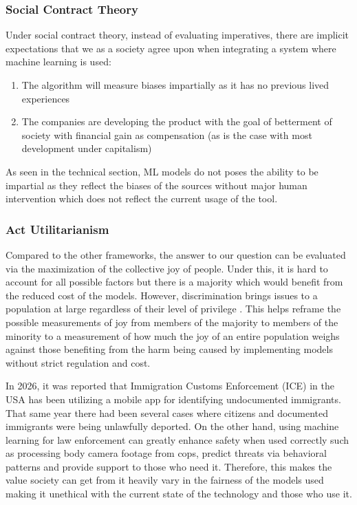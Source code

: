 \subsubsection{Social Contract Theory}
Under social contract theory, instead of evaluating imperatives, there are implicit expectations that we as a society agree upon when integrating a system where machine learning is used:

\begin{enumerate}
	\item{The algorithm will measure biases impartially as it has no previous lived experiences}
	\item{The companies are developing the product with the goal of betterment of society with financial gain as compensation (as is the case with most development under capitalism)}
\end{enumerate}

As seen in the technical section, ML models do not poses the ability to be impartial as they reflect the biases of the sources without major human intervention which does not reflect the current usage of the tool. \cite{GenderShades}

\subsubsection{Act Utilitarianism}
Compared to the other frameworks, the answer to our question can be evaluated via the maximization of the collective joy of people. Under this, it is hard to account for all possible factors but there is a majority which would benefit from the reduced cost of the models. However, discrimination brings issues to a population at large regardless of their level of privilege \cite{RacismDamage}. This helps reframe the possible measurements of joy from members of the majority to members of the minority to a measurement of how much the joy of an entire population weighs against those benefiting from the harm being caused by implementing models without strict regulation and cost. \cite{ConsiderationsOfMl}

In 2026, it was reported that Immigration Customs Enforcement (ICE) in the USA has been utilizing a mobile app for identifying undocumented immigrants. That same year there had been several cases where citizens and documented immigrants were being unlawfully deported. On the other hand, using machine learning for law enforcement can greatly enhance safety when used correctly such as processing body camera footage from cops, predict threats via behavioral patterns and provide support to those who need it. Therefore, this makes the value society can get from it heavily vary in the fairness of the models used making it unethical with the current state of the technology and those who use it. \cite{ICE-FacialRecognition}

